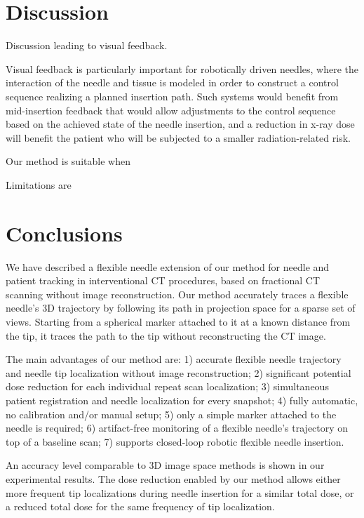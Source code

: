 \documentclass[letterpaper, 11 pt, conference]{ieeeconf}  %
\begin{document}
\section{Discussion}
Discussion leading to visual feedback.

Visual feedback is particularly important for robotically driven needles, where the interaction of the needle and tissue is modeled in order to construct a control sequence realizing a planned insertion path. Such systems would benefit from mid-insertion feedback that would allow adjustments to the control sequence based on the achieved state of the needle insertion, and a reduction in x-ray dose will benefit the patient who will be subjected to a smaller radiation-related risk.

Our method is suitable when

Limitations are
 

\section{Conclusions}
We have described a flexible needle extension of our method for needle and patient tracking in interventional CT procedures, based on fractional CT scanning without image reconstruction.
Our method accurately traces a flexible needle's 3D trajectory by following its path in projection space for a sparse set of views. Starting from a spherical marker attached to it at a known distance from the tip, it traces the path to the tip without reconstructing the CT image.

The main advantages of our method are:
1) accurate flexible needle trajectory and needle tip localization without image reconstruction;
2) significant potential dose reduction for each individual repeat scan localization;
3) simultaneous patient registration and needle localization for every snapshot; 
4) fully automatic, no calibration and/or manual setup;
5) only a simple marker attached to the needle is required; 
6) artifact-free monitoring of a flexible needle's trajectory on top of a baseline scan;
7) supports closed-loop robotic flexible needle insertion.

An accuracy level comparable to 3D image space methods is shown in our experimental results.
The dose reduction enabled by our method allows either more frequent tip localizations during needle insertion for a similar total dose, or a reduced total dose for the same frequency of tip localization.



\end{document}
